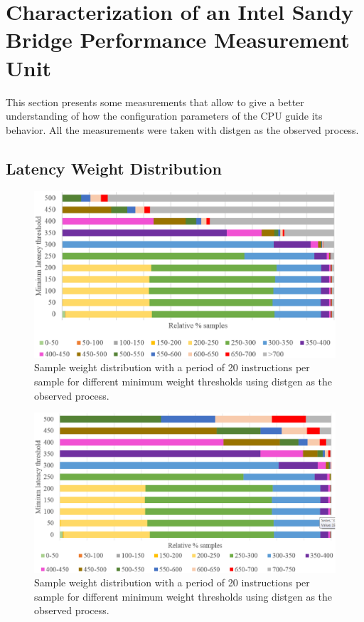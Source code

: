 \section{Characterization of an Intel Sandy Bridge Performance Measurement Unit}\label{section:pmu-charzn}
This section presents some measurements that allow to give a better understanding of how the configuration parameters of the CPU guide its behavior. All the measurements were taken with distgen as the observed process.


\subsection{Latency Weight Distribution}\label{subsection:pmu-latwei}

\begin{figure}[th]
	\centering
		\includegraphics[width=.8\textwidth]{figures/latencydistw20.eps}
		\caption[Sample weight distribution with a period of 20 instructions per sample.]{Sample weight distribution with a period of 20 instructions per sample for different minimum weight thresholds using distgen as the observed process. }
		\label{fig:latencydistw20}
\end{figure}

\begin{figure}[h]
	\centering
		\includegraphics[width=.8\textwidth]{figures/latencydistw200.eps}
		\caption[Sample weight distribution with a period of 200 instructions per sample.]{Sample weight distribution with a period of 20 instructions per sample for different minimum weight thresholds using distgen as the observed process.}
		\label{fig:latencydistw200}
\end{figure}


